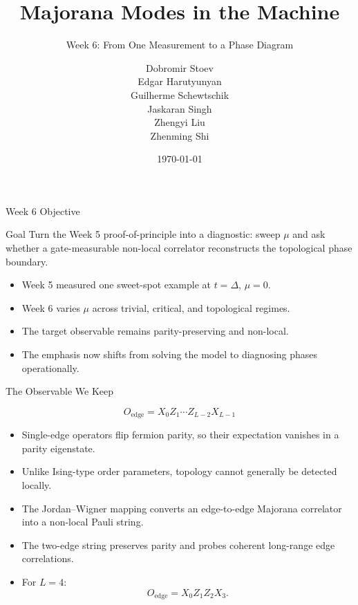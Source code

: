 \documentclass[aspectratio=169, 12pt]{beamer}
\title[Kitaev Chain -- Block 3]{Majorana Modes in the Machine}
\subtitle{Week 6: From One Measurement to a Phase Diagram}
\author{Dobromir Stoev\\ Edgar Harutyunyan\\ Guilherme Schewtschik\\ Jaskaran Singh\\ Zhengyi Liu\\ Zhenming Shi}
\institute{Advanced Seminar -- AI-Augmented Theoretical Physics}
\date{\today}
\newcommand{\Ostring}{X_0 Z_1\cdots Z_{L-2} X_{L-1}}
\begin{document}

\begin{frame}
  \titlepage
\end{frame}


\begin{frame}{Week 6 Objective}
  \begin{block}{Goal}
    Turn the Week 5 proof-of-principle into a diagnostic: sweep $\mu$ and ask whether a gate-measurable non-local correlator reconstructs the topological phase boundary.
  \end{block}

  \begin{itemize}
    \item Week 5 measured one sweet-spot example at $t=\Delta$, $\mu=0$.
    \item Week 6 varies $\mu$ across trivial, critical, and topological regimes.
    \item The target observable remains parity-preserving and non-local.
    \item The emphasis now shifts from solving the model to diagnosing phases operationally.
  \end{itemize}
\end{frame}



\begin{frame}{The Observable We Keep}

  \begin{equation*}
    O_{\mathrm{edge}} = \Ostring
  \end{equation*}

  \begin{itemize}
    \item Single-edge operators flip fermion parity, so their expectation vanishes in a parity eigenstate.

    \item Unlike Ising-type order parameters, topology cannot generally be detected locally.

    \item The Jordan--Wigner mapping converts an edge-to-edge Majorana correlator into a non-local Pauli string.

    \item The two-edge string preserves parity and probes coherent long-range edge correlations.

    \item For $L=4$:
    \[
      O_{\mathrm{edge}} = X_0 Z_1 Z_2 X_3.
    \]
  \end{itemize}

\end{frame}
\end{document}
